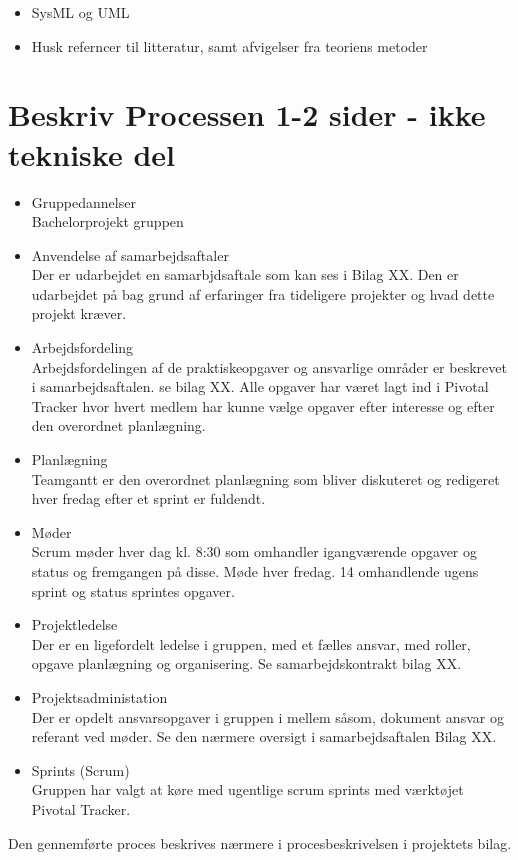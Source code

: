 \begin{itemize}
\item SysML og UML
\item Husk referncer til litteratur, samt afvigelser fra teoriens metoder
\end{itemize}

\section{Beskriv Processen 1-2 sider - ikke tekniske del}
\begin{itemize}
\item Gruppedannelser\\
Bachelorprojekt gruppen 




\item Anvendelse af samarbejdsaftaler\\
Der er udarbejdet en samarbjdsaftale som kan ses i Bilag XX. Den er udarbejdet på bag grund af erfaringer fra tideligere projekter og hvad dette projekt kræver.
\item Arbejdsfordeling\\
Arbejdsfordelingen af de praktiskeopgaver og ansvarlige områder er beskrevet i samarbejdsaftalen. se bilag XX. Alle opgaver har været lagt ind i Pivotal Tracker hvor hvert medlem har kunne vælge opgaver efter interesse og efter den overordnet planlægning.
\item Planlægning\\
Teamgantt er den overordnet planlægning som bliver diskuteret og redigeret hver fredag efter et sprint er fuldendt.  
\item Møder\\
Scrum møder hver dag kl. 8:30 som omhandler igangværende opgaver og status og fremgangen på disse. Møde hver fredag. 14 omhandlende ugens sprint og status sprintes opgaver. 
\item Projektledelse\\
Der er en ligefordelt ledelse i gruppen, med et fælles ansvar, med roller, opgave planlægning og organisering. Se samarbejdskontrakt bilag XX.

\item Projektsadministation\\
Der er opdelt ansvarsopgaver i gruppen i mellem såsom, dokument ansvar og referant ved møder. Se den nærmere oversigt i samarbejdsaftalen Bilag XX.
\item Sprints (Scrum)\\
Gruppen har valgt at køre med ugentlige scrum sprints med værktøjet Pivotal Tracker. 
\end{itemize}
Den gennemførte proces beskrives nærmere i procesbeskrivelsen i projektets bilag.


